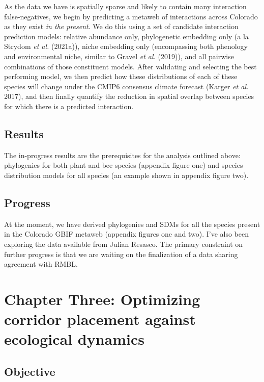 \documentclass[11pt]{article}
\begin{document}
As the data we have is spatially sparse and likely to contain many
interaction false-negatives, we begin by predicting a metaweb of
interactions across Colorado as they exist \emph{in the present}. We do
this using a set of candidate interaction prediction models: relative
abundance only, phylogenetic embedding only (a la Strydom \emph{et al.}
(2021a)), niche embedding only (encompassing both phenology and
environmental niche, similar to Gravel \emph{et al.} (2019)), and all
pairwise combinations of those constituent models. After validating and
selecting the best performing model, we then predict how these
distributions of each of these species will change under the CMIP6
consensus climate forecast (Karger \emph{et al.} 2017), and then finally
quantify the reduction in spatial overlap between species for which
there is a predicted interaction.

\hypertarget{results-1}{%
\subsection{Results}\label{results-1}}

The in-progress results are the prerequisites for the analysis outlined
above: phylogenies for both plant and bee species (appendix figure one)
and species distribution models for all species (an example shown in
appendix figure two).

\hypertarget{progress-1}{%
\subsection{Progress}\label{progress-1}}

At the moment, we have derived phylogenies and SDMs for all the species
present in the Colorado GBIF metaweb (appendix figures one and two).
I've also been exploring the data available from Julian Resasco. The
primary constraint on further progress is that we are waiting on the
finalization of a data sharing agreement with RMBL.

\hypertarget{chapter-three-optimizing-corridor-placement-against-ecological-dynamics}{%
\section{Chapter Three: Optimizing corridor placement against ecological
dynamics}\label{chapter-three-optimizing-corridor-placement-against-ecological-dynamics}}

\hypertarget{objective-2}{%
\subsection{Objective}\label{objective-2}}
\end{document}
